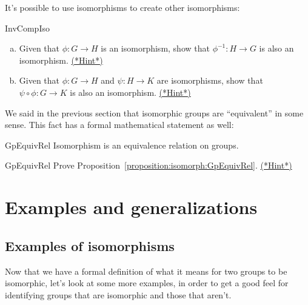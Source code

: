 It's possible to use isomorphisms to create other isomorphisms:

\begin{exercise}{InvCompIso}
\begin{enumerate}[(a)]
\item
Given that  $\phi : G \rightarrow H$ is an  isomorphism, show that  $\phi^{-1} : H \rightarrow G$ is also an  isomorphism.
\hyperref[sec:isomorph:hints]{(*Hint*)}
\item
Given that  $\phi : G \rightarrow H$ and $\psi : H \rightarrow K$ are  isomorphisms, show that  $\psi \circ\phi:G \rightarrow K$ is also an  isomorphism.
\hyperref[sec:isomorph:hints]{(*Hint*)}
\end{enumerate}
\end{exercise}

We said in the previous section that isomorphic groups are ``equivalent'' in some sense. This fact has a formal mathematical statement as well:

\begin{prop}{GpEquivRel}
Isomorphism is an equivalence relation on groups. 
\end{prop}

\begin{exercise}{GpEquivRel}
Prove Proposition~\ref{proposition:isomorph:GpEquivRel}.
\hyperref[sec:isomorph:hints]{(*Hint*)}
\end{exercise}

\section{Examples and generalizations}
\label{sec:iso_more_ex}

\subsection{Examples of isomorphisms}
Now that we have a formal definition of what it means for two groups to be isomorphic, let's look at some more examples, in order to get a good feel for identifying groups that are isomorphic and those that aren't.

